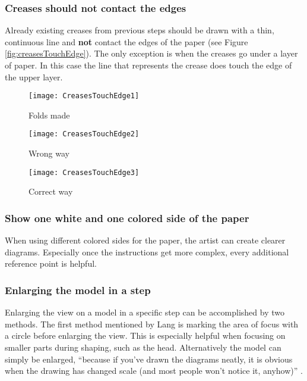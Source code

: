 \subsubsection*{Creases should not contact the edges}
Already existing creases from previous steps should be drawn with a thin, continuous line and \textbf{not} contact the edges of the paper (see Figure \ref{fig:creasesTouchEdge}). The only exception is when the creases go under a layer of paper. In this case the line that represents the crease does touch the edge of the upper layer.
\begin{figure*}[htbp]
    \centering
    \begin{subfigure}{0.3\textwidth}
        \texttt{[image: CreasesTouchEdge1]}
        \caption{Folds made}
        \label{fig:creasesTouchEdge1}
    \end{subfigure}
    \begin{subfigure}{0.3\textwidth}
        \texttt{[image: CreasesTouchEdge2]}
        \caption{Wrong way}
        \label{fig:creasesTouchEdge2}
    \end{subfigure}
    \begin{subfigure}{0.3\textwidth}
        \texttt{[image: CreasesTouchEdge3]}
        \caption{Correct way}
        \label{fig:creasesTouchEdge3}
    \end{subfigure}
    \caption{Correct way to draw existing creases}\label{fig:creasesTouchEdge}
\end{figure*}

\subsubsection*{Show one white and one colored side of the paper}
When using different colored sides for the paper, the artist can create clearer diagrams. Especially once the instructions get more complex, every additional reference point is helpful.

\subsubsection*{Enlarging the model in a step}
Enlarging the view on a model in a specific step can be accomplished by two methods. The first method mentioned by Lang is marking the area of focus with a circle before enlarging the view. This is especially helpful when focusing on smaller parts during shaping, such as the head. Alternatively the model can simply be enlarged, \enquote{because if you've drawn the diagrams neatly, it is obvious when the drawing has changed scale (and most people won't notice it, anyhow)} \cite{Lang}.

